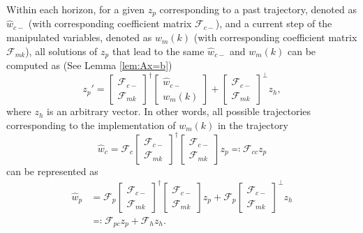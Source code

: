 \documentclass[11pt,print,draftcls,onecolumn,romanappendices]{ieeecolor}
\newcommand{\F}{\mathcal{F}}
\begin{document}
{Within each horizon, for a given $z_p$ corresponding to a past trajectory, denoted as $\hat{w}_{c-}$ (with corresponding coefficient matrix $\F_{c-}$), and a current step of the manipulated variables, denoted as $w_m(k)$ (with corresponding coefficient matrix $\F_{mk}$), all solutions of $z_p$ that lead to the same $\hat{w}_{c-}$ and $w_m(k)$ can be computed as (See Lemma \ref{lem:Ax=b})
\begin{equation}\label{eq:zpCal}
    z_p'=\begin{bmatrix}
        \F_{c-}\\ \F_{mk}
    \end{bmatrix}^\dagger\begin{bmatrix}
        \hat{w}_{c-}\\ w_m(k)
    \end{bmatrix} + \begin{bmatrix}
        \F_{c-}\\ \F_{mk}
    \end{bmatrix}^\perp z_h,
\end{equation}
where $z_h$ is an arbitrary vector. In other words, all possible trajectories corresponding to the implementation of $w_m(k)$ in the trajectory
\begin{equation}\label{eq:controlImp}
    \hat{w}_c=\F_c\begin{bmatrix}
        \F_{c-}\\ \F_{mk}
    \end{bmatrix}^\dagger\begin{bmatrix}
        \F_{c-}\\ \F_{mk}
    \end{bmatrix}z_p\eqqcolon\F_{cc}z_p
\end{equation}
can be represented as
\begin{equation}\label{eq:wpControlled}
    \begin{split}
        \hat{w}_p&=\F_p\begin{bmatrix}
        \F_{c-}\\ \F_{mk}
    \end{bmatrix}^\dagger\begin{bmatrix}
        \F_{c-}\\ \F_{mk}
    \end{bmatrix}z_p+\F_p\begin{bmatrix}
        \F_{c-}\\ \F_{mk}
    \end{bmatrix}^\perp z_h\\
    &\eqqcolon\F_{pc}z_p+\F_hz_h.
    \end{split}
\end{equation}

}
\end{document}
